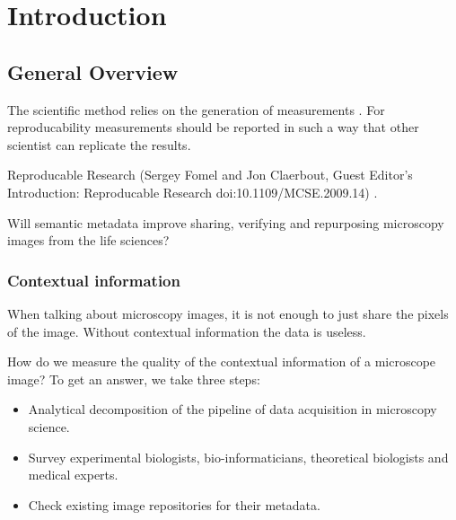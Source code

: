 
\chapter{Introduction} %

\label{Chapter1}



\section{General Overview}

The scientific method  relies on the
generation of measurements . For reproducability
 measurements should be reported in such a way
that other scientist can replicate the results.

Reproducable Research (Sergey Fomel and Jon Claerbout, Guest Editor's
Introduction: Reproducable Research doi:10.1109/MCSE.2009.14)
.

Will semantic metadata improve sharing, verifying and repurposing
microscopy images from the life sciences?

\subsection{Contextual information}

When talking about microscopy images, it is not enough to just share
the pixels of the image. Without contextual information the data is
useless.

How do we measure the quality of the contextual information of a
microscope image? To get an answer, we take three steps:
\begin{itemize}
\item Analytical decomposition of the pipeline of data acquisition in
  microscopy science.
\item Survey experimental biologists, bio-informaticians, theoretical
  biologists and medical experts.
\item Check existing image repositories for their metadata.
\end{itemize}

